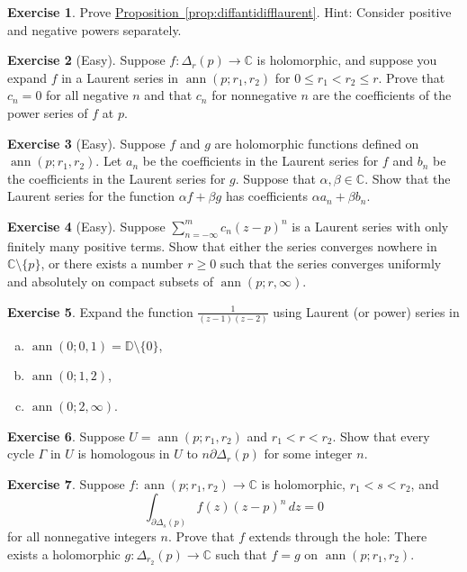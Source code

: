 \documentclass[12pt,openany]{book}
\newcommand{\ann}{\operatorname{ann}}
\newcommand{\C}{{\mathbb{C}}}
\newcommand{\D}{{\mathbb{D}}}
\theoremstyle{plain}
\theoremstyle{remark}
\theoremstyle{definition}
\newenvironment{exbox}{%
    \def\FrameCommand{\vrule width 1pt \relax\hspace{10pt}}%
    \MakeFramed{\advance\hsize-\width\FrameRestore}%
}{%
    \endMakeFramed
}
\newenvironment{exparts}{%
    \leavevmode\begin{enumerate}[a),noitemsep,topsep=0pt,parsep=0pt,partopsep=0pt]
}{%
    \end{enumerate}
}
\theoremstyle{exercise}
\newtheorem{exercise}{Exercise}[section]
\theoremstyle{example}
\newcommand{\propref}[1]{\hyperref[#1]{Proposition~\ref*{#1}}}
\begin{document}
\begin{exbox}
\begin{exercise}
Prove \propref{prop:diffantidifflaurent}.  Hint: Consider positive and
negative powers separately.
\end{exercise}

\begin{exercise}[Easy]
Suppose $f \colon \Delta_r(p) \to \C$ is holomorphic, and suppose you expand
$f$ in a Laurent series in $\ann(p;r_1,r_2)$ for $0 \leq r_1 < r_2 \leq r$.
Prove that $c_n = 0$ for all negative $n$ and that $c_n$ for nonnegative $n$
are the coefficients of the power series of $f$ at $p$.
\end{exercise}

\begin{exercise}[Easy]
Suppose $f$ and $g$ are holomorphic functions defined on
$\ann(p;r_1,r_2)$.  Let $a_n$ be the coefficients in the Laurent series for
$f$ and $b_n$ be the coefficients in the Laurent series for $g$.  Suppose
that $\alpha,\beta \in \C$.  Show that the Laurent series for the function
$\alpha f + \beta g$ has coefficients $\alpha a_n + \beta b_n$.
\end{exercise}

\begin{exercise}[Easy]
Suppose $\sum_{n=-\infty}^m c_n {(z-p)}^n$ is a Laurent series with only
finitely many positive terms.  Show that either the series converges
nowhere in $\C \setminus \{ p \}$, or there exists a number $r \geq 0$ such that the series
converges uniformly and absolutely on compact subsets of
$\ann(p;r,\infty)$.
\end{exercise}

\begin{exercise}
Expand the function $\frac{1}{(z-1)(z-2)}$ using Laurent (or power) series in 
\begin{exparts}
\item $\ann(0;0,1) = \D \setminus \{ 0 \}$,
\item $\ann(0;1,2)$,
\item $\ann(0;2,\infty)$.
\end{exparts}
\end{exercise}

\begin{exercise}
Suppose $U = \ann(p;r_1,r_2)$ and $r_1 < r < r_2$.
Show that every cycle $\Gamma$ in $U$ is homologous in $U$
to $n \partial \Delta_r(p)$ for some integer $n$.
\end{exercise}

\begin{exercise}
Suppose $f \colon \ann(p;r_1,r_2) \to \C$ is holomorphic,
$r_1 < s < r_2$, and
\begin{equation*}
\int_{\partial \Delta_{s}(p)} f(z){(z-p)}^n
 \, dz = 0
\end{equation*}
for all nonnegative integers $n$.  Prove that $f$ extends through the hole:
There exists a holomorphic $g \colon \Delta_{r_2}(p) \to \C$ such that 
$f = g$ on $\ann(p;r_1,r_2)$.
\end{exercise}


\end{exbox}
\end{document}
